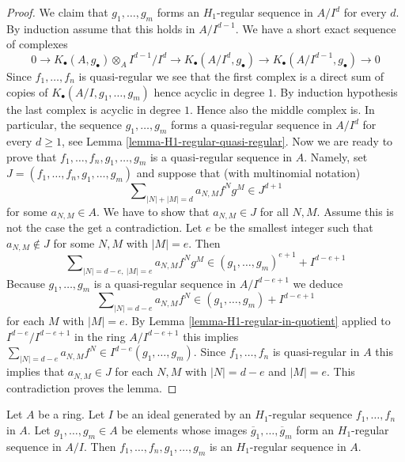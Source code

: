 \begin{proof}
We claim that $g_1, \ldots, g_m$ forms an $H_1$-regular sequence in
$A/I^d$ for every $d$. By induction assume that this holds in
$A/I^{d - 1}$. We have a short exact sequence of complexes
$$
0 \to K_\bullet(A, g_\bullet) \otimes_A I^{d - 1}/I^d
\to K_\bullet(A/I^d, g_\bullet) \to
K_\bullet(A/I^{d - 1}, g_\bullet) \to 0
$$
Since $f_1, \ldots, f_n$ is quasi-regular we see that the first complex
is a direct sum of copies of $K_\bullet(A/I, g_1, \ldots, g_m)$
hence acyclic in degree $1$. By induction hypothesis the last complex is
acyclic in degree $1$. Hence also the middle complex is.
In particular, the sequence $g_1, \ldots, g_m$ forms a quasi-regular
sequence in $A/I^d$ for every $d \geq 1$, see
Lemma \ref{lemma-H1-regular-quasi-regular}.
Now we are ready to prove that $f_1, \ldots, f_n, g_1, \ldots, g_m$
is a quasi-regular sequence in $A$.
Namely, set $J = (f_1, \ldots, f_n, g_1, \ldots, g_m)$ and suppose
that (with multinomial notation)
$$
\sum\nolimits_{|N| + |M| = d} a_{N, M} f^N g^M \in J^{d + 1}
$$
for some $a_{N, M} \in A$. We have to show that $a_{N, M} \in J$
for all $N, M$. Assume this is not the case the get a contradiction.
Let $e$ be the smallest integer such that
$a_{N, M} \not \in J$ for some $N, M$ with $|M| = e$.
Then
$$
\sum\nolimits_{|N| = d - e,\ |M| = e} a_{N, M} f^N g^M \in
(g_1, \ldots, g_m)^{e + 1} + I^{d - e + 1}
$$
Because $g_1, \ldots, g_m$ is a quasi-regular sequence in $A/I^{d - e + 1}$
we deduce
$$
\sum\nolimits_{|N| = d - e} a_{N, M} f^N \in
(g_1, \ldots, g_m) + I^{d - e + 1}
$$
for each $M$ with $|M| = e$. By
Lemma \ref{lemma-H1-regular-in-quotient}
applied to $I^{d - e}/I^{d - e + 1}$ in the ring $A/I^{d - e + 1}$
this implies $\sum_{|N| = d - e} a_{N, M} f^N \in I^{d - e}(g_1, \ldots, g_m)$.
Since $f_1, \ldots, f_n$ is quasi-regular in $A$ this implies
that $a_{N, M} \in J$ for each $N, M$ with $|N| = d - e$ and $|M| = e$.
This contradiction proves the lemma.
\end{proof}

\begin{lemma}
\label{lemma-join-H1-regular-sequences}
Let $A$ be a ring. Let $I$ be an ideal generated by an
$H_1$-regular sequence $f_1, \ldots, f_n$ in $A$.
Let $g_1, \ldots, g_m \in A$ be elements whose images
$\overline{g}_1, \ldots, \overline{g}_m$ form an $H_1$-regular sequence
in $A/I$. Then $f_1, \ldots, f_n, g_1, \ldots, g_m$ is an $H_1$-regular
sequence in $A$.
\end{lemma}

